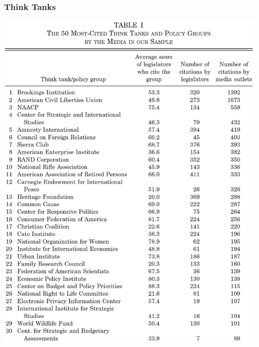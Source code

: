 \documentclass[english]{beamer}
\begin{document}
\begin{frame}
\frametitle{Think Tanks}
\vspace{-10pt}
\begin{center}
\includegraphics[scale=0.33]{Images/groseclose_milyio_table3}
\end{center}
\end{frame}
\end{document}
